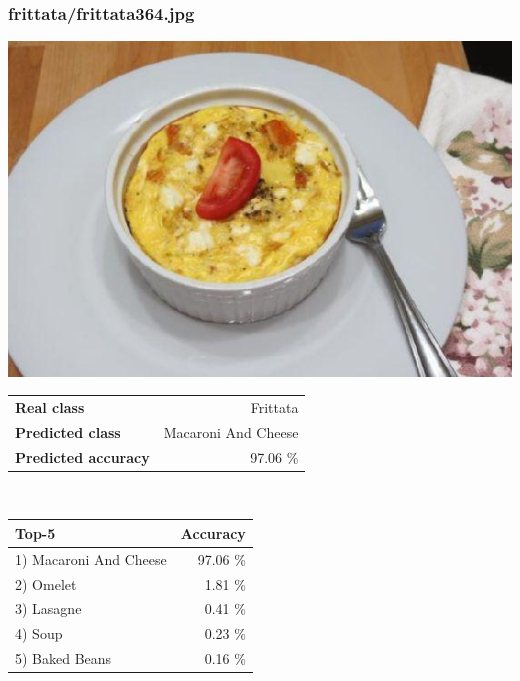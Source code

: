\subsubsection{frittata/frittata364.jpg}

\begin{minipage}[t]{0.4\textwidth}
	\vspace{0pt}
	\includegraphics[width=\linewidth]{images/evaluation-images/frittata/frittata364.jpg}
\end{minipage}
\hfill
\begin{minipage}[t]{0.5\textwidth}
	\vspace{0pt}\raggedright
	\begin{tabularx}{\textwidth}{X r}
		\small \textbf{Real class} & \small Frittata\\
		\small \textbf{Predicted class} & \small Macaroni And Cheese\\
		\small \textbf{Predicted accuracy} & \small 97.06 \%
    \end{tabularx}\\
    
    \vspace{6pt}
	\begin{tabularx}{\textwidth}{X r}
        \small \textbf{Top-5} & \small \textbf{Accuracy} \\
        \hline
		\small 1) Macaroni And Cheese & \small 97.06 \%\\\small 2) Omelet & \small 1.81 \%\\\small 3) Lasagne & \small 0.41 \%\\\small 4) Soup & \small 0.23 \%\\\small 5) Baked Beans & \small 0.16 \%
    \end{tabularx}
\end{minipage}
    
